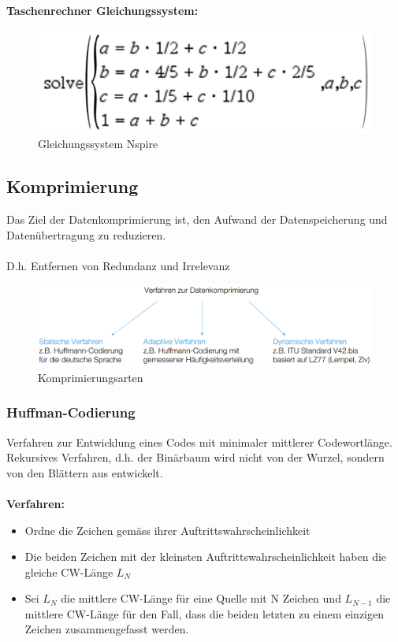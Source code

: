 \textbf{Taschenrechner Gleichungssystem:}\\
\begin{figure}[h!]
	\centering
	\begin{minipage}[t]{0.5\textwidth}
		\centering
		\includegraphics[width=0.9\linewidth]{images/gls}
		\caption{Gleichungssystem Nspire}
		\label{fig:gls}
	\end{minipage}
\end{figure}

\subsection{Komprimierung}
Das Ziel der Datenkomprimierung ist, den Aufwand der Datenspeicherung und Datenübertragung zu reduzieren.\\
\\
D.h. Entfernen von Redundanz und Irrelevanz 
\begin{figure}[h!]
	\centering
	\begin{minipage}[t]{0.7\textwidth}
		\centering
		\includegraphics[width=0.9\linewidth]{images/datenkomprimierung}
		\caption{Komprimierungsarten}
		\label{fig:komprimierung}
	\end{minipage}
\end{figure}

\subsubsection{Huffman-Codierung}
Verfahren zur Entwicklung eines Codes mit minimaler mittlerer Codewortlänge. \\
Rekursives Verfahren, d.h. der Binärbaum wird nicht von der Wurzel, sondern von den Blättern aus entwickelt. \\
\\
\textbf{Verfahren:}
\begin{itemize}
	\item Ordne die Zeichen gemäss ihrer Auftrittswahrscheinlichkeit
	\item Die beiden Zeichen mit der kleinsten Auftrittswahrscheinlichkeit haben die gleiche CW-Länge \textbf{$L_N$}
	\item Sei \textbf{$L_N$} die mittlere CW-Länge für eine Quelle mit N Zeichen und $L_{N-1}$ die mittlere CW-Länge für den Fall, dass die beiden letzten zu einem einzigen Zeichen zusammengefasst werden.
\end{itemize}

